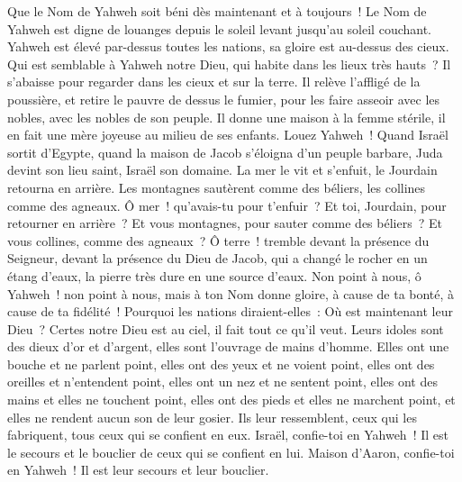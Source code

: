 \begin{multicols}{2}
Que le Nom de Yahweh soit béni dès maintenant et à toujours~!
Le Nom de Yahweh est digne de louanges depuis le soleil levant jusqu'au soleil couchant.
Yahweh est élevé par-dessus toutes les nations, sa gloire est au-dessus des cieux.
Qui est semblable à Yahweh notre Dieu, qui habite dans les lieux très hauts~?
Il s'abaisse pour regarder dans les cieux et sur la terre.
Il relève l'affligé de la poussière, et retire le pauvre de dessus le fumier,
pour les faire asseoir avec les nobles, avec les nobles de son peuple.
Il donne une maison à la femme stérile, il en fait une mère joyeuse au milieu de ses enfants. Louez Yahweh~!
\VerseOne{}Quand Israël sortit d'Egypte, quand la maison de Jacob s'éloigna d'un peuple barbare,
Juda devint son lieu saint, Israël son domaine.
La mer le vit et s'enfuit, le Jourdain retourna en arrière.
Les montagnes sautèrent comme des béliers, les collines comme des agneaux.
Ô mer~! qu'avais-tu pour t'enfuir~? Et toi, Jourdain, pour retourner en arrière~?
Et vous montagnes, pour sauter comme des béliers~? Et vous collines, comme des agneaux~?
Ô terre~! tremble devant la présence du Seigneur, devant la présence du Dieu de Jacob,
qui a changé le rocher en un étang d'eaux, la pierre très dure en une source d'eaux.
\VerseOne{}Non point à nous, ô Yahweh~! non point à nous, mais à ton Nom donne gloire, à cause de ta bonté, à cause de ta fidélité~!
Pourquoi les nations diraient-elles~: Où est maintenant leur Dieu~?
Certes notre Dieu est au ciel, il fait tout ce qu'il veut.
Leurs idoles sont des dieux d'or et d'argent, elles sont l'ouvrage de mains d'homme.
Elles ont une bouche et ne parlent point, elles ont des yeux et ne voient point,
elles ont des oreilles et n'entendent point, elles ont un nez et ne sentent point,
elles ont des mains et elles ne touchent point, elles ont des pieds et elles ne marchent point, et elles ne rendent aucun son de leur gosier.
Ils leur ressemblent, ceux qui les fabriquent, tous ceux qui se confient en eux.
Israël, confie-toi en Yahweh~! Il est le secours et le bouclier de ceux qui se confient en lui.
Maison d'Aaron, confie-toi en Yahweh~! Il est leur secours et leur bouclier.

\end{multicols}
